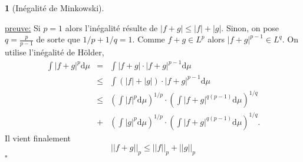 \documentclass[8pt,notheorems]{beamer}
\newtheorem{lemma}{\translate{Lemme}}
\theoremstyle{definition}
\theoremstyle{example}
\theoremstyle{mystyle}
\theoremstyle{plain}
\begin{document}
\begin{frame}[allowframebreaks]
\begin{lemma}[Inégalité de Minkowski]
$$$$
\end{lemma}
\underline{preuve:}
Si $p = 1$ alors l'inégalité résulte de $|f+g|\leq |f|+|g|$. Sinon, on pose $q = \frac{p}{p-1}$ de sorte que $1/p+1/q = 1$. Comme $f+g\in L^p$ alors $|f+g|^{p-1}\in L^q$. On utilise l'inégalité de Hölder, 
\begin{eqnarray*}
\int|f+g|^p\text{d}\mu &=& \int|f+g|\cdot |f+g|^{p-1}\text{d}\mu\\  
&\leq&\int(|f|+|g|)\cdot |f+g|^{p-1}\text{d}\mu\\
&\leq&\left(\int|f|^p\text{d}\mu\right)^{1/p} \cdot \left(\int|f+g|^{q(p-1)}\text{d}\mu\right)^{1/q}\\
&+&\left(\int |g|^p\text{d}\mu\right)^{1/p}\cdot\left( \int |f+g|^{q(p-1)}\text{d}\mu\right)^{1/q}.
\end{eqnarray*}
Il vient finalement 
$$
||f+g||_p\leq ||f||_p+||g||_p
$$
$\square$

\end{frame}
\end{document}
